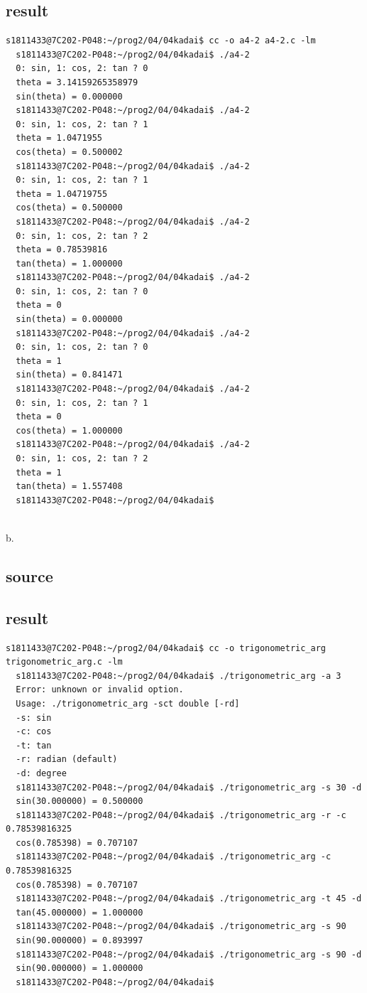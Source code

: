 \documentclass[10pt,a4paper]{jsarticle}
\begin{document}
\subsection{result}
\begin{lstlisting}[basicstyle=\ttfamily\footnotesize,frame=single]
  s1811433@7C202-P048:~/prog2/04/04kadai$ cc -o a4-2 a4-2.c -lm
  s1811433@7C202-P048:~/prog2/04/04kadai$ ./a4-2
  0: sin, 1: cos, 2: tan ? 0
  theta = 3.14159265358979
  sin(theta) = 0.000000
  s1811433@7C202-P048:~/prog2/04/04kadai$ ./a4-2
  0: sin, 1: cos, 2: tan ? 1
  theta = 1.0471955
  cos(theta) = 0.500002
  s1811433@7C202-P048:~/prog2/04/04kadai$ ./a4-2
  0: sin, 1: cos, 2: tan ? 1
  theta = 1.04719755
  cos(theta) = 0.500000
  s1811433@7C202-P048:~/prog2/04/04kadai$ ./a4-2
  0: sin, 1: cos, 2: tan ? 2
  theta = 0.78539816
  tan(theta) = 1.000000
  s1811433@7C202-P048:~/prog2/04/04kadai$ ./a4-2
  0: sin, 1: cos, 2: tan ? 0
  theta = 0
  sin(theta) = 0.000000
  s1811433@7C202-P048:~/prog2/04/04kadai$ ./a4-2
  0: sin, 1: cos, 2: tan ? 0
  theta = 1
  sin(theta) = 0.841471
  s1811433@7C202-P048:~/prog2/04/04kadai$ ./a4-2
  0: sin, 1: cos, 2: tan ? 1
  theta = 0
  cos(theta) = 1.000000
  s1811433@7C202-P048:~/prog2/04/04kadai$ ./a4-2
  0: sin, 1: cos, 2: tan ? 2
  theta = 1
  tan(theta) = 1.557408
  s1811433@7C202-P048:~/prog2/04/04kadai$
  
\end{lstlisting}

b.
\subsection{source}



\subsection{result}
\begin{lstlisting}[basicstyle=\ttfamily\footnotesize,frame=single]
  s1811433@7C202-P048:~/prog2/04/04kadai$ cc -o trigonometric_arg trigonometric_arg.c -lm
  s1811433@7C202-P048:~/prog2/04/04kadai$ ./trigonometric_arg -a 3
  Error: unknown or invalid option.
  Usage: ./trigonometric_arg -sct double [-rd]
  -s: sin
  -c: cos
  -t: tan
  -r: radian (default)
  -d: degree
  s1811433@7C202-P048:~/prog2/04/04kadai$ ./trigonometric_arg -s 30 -d
  sin(30.000000) = 0.500000
  s1811433@7C202-P048:~/prog2/04/04kadai$ ./trigonometric_arg -r -c 0.78539816325
  cos(0.785398) = 0.707107
  s1811433@7C202-P048:~/prog2/04/04kadai$ ./trigonometric_arg -c 0.78539816325
  cos(0.785398) = 0.707107
  s1811433@7C202-P048:~/prog2/04/04kadai$ ./trigonometric_arg -t 45 -d
  tan(45.000000) = 1.000000
  s1811433@7C202-P048:~/prog2/04/04kadai$ ./trigonometric_arg -s 90
  sin(90.000000) = 0.893997
  s1811433@7C202-P048:~/prog2/04/04kadai$ ./trigonometric_arg -s 90 -d
  sin(90.000000) = 1.000000
  s1811433@7C202-P048:~/prog2/04/04kadai$
  
\end{lstlisting}
\end{document}
